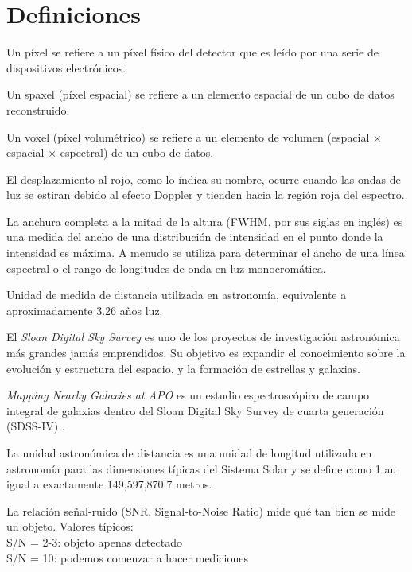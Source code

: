 \documentclass[10pt,twocolumn,a4paper]{opticajnl}
\begin{document}
\section*{Definiciones}
\begin{description}[style=nextline]
  \item[pixel] Un píxel se refiere a un píxel físico del detector que es leído por una serie de dispositivos electrónicos.
  \item[spaxel] Un spaxel (píxel espacial) se refiere a un elemento espacial de un cubo de datos reconstruido.
  \item[voxel] Un voxel (píxel volumétrico) se refiere a un elemento de volumen (espacial × espacial × espectral) de un cubo de datos. 
  \item[redshift] El desplazamiento al rojo, como lo indica su nombre, ocurre cuando las ondas de luz se estiran debido al efecto Doppler y tienden hacia la región roja del espectro.
  \item[FWHM] La anchura completa a la mitad de la altura (FWHM, por sus siglas en inglés) es una medida del ancho de una distribución de intensidad en el punto donde la intensidad es máxima. A menudo se utiliza para determinar el ancho de una línea espectral o el rango de longitudes de onda en luz monocromática. 
  \item[pársec] Unidad de medida de distancia utilizada en astronomía, equivalente a aproximadamente 3.26 años luz.
  \item[SDSS] El \textit{Sloan Digital Sky Survey} es uno de los proyectos de investigación astronómica más grandes jamás emprendidos. Su objetivo es expandir el conocimiento sobre la evolución y estructura del espacio, y la formación de estrellas y galaxias.
  \item[MaNGA] \textit{Mapping Nearby Galaxies at APO} es un estudio espectroscópico de campo integral de galaxias dentro del Sloan Digital Sky Survey de cuarta generación (SDSS-IV) \cite{weijmans2015manga}.
  \item[Unidad Astronómica / au] La unidad astronómica de distancia es una unidad de longitud utilizada en astronomía para las dimensiones típicas del Sistema Solar y se define como 1 au igual a exactamente 149,597,870.7 metros.
  \item[S/N] La relación señal-ruido (SNR, Signal-to-Noise Ratio) mide qué tan bien se mide un objeto. Valores típicos: \\
  S/N = 2-3: objeto apenas detectado \\
  S/N = 10: podemos comenzar a hacer mediciones \\

\end{description}
\end{document}
